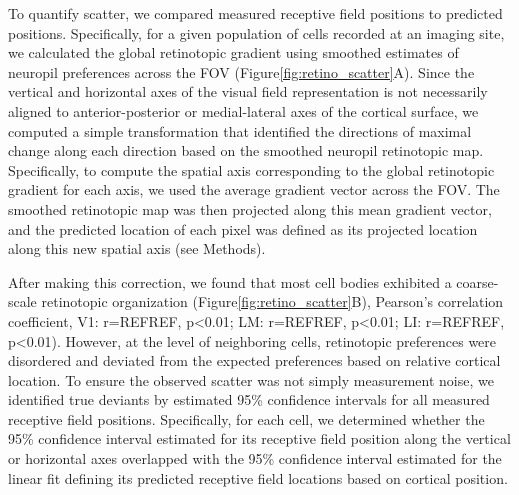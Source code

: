 To quantify scatter, we compared measured receptive field positions to predicted positions. Specifically, for a given population of cells recorded at an imaging site, we calculated the global retinotopic gradient using smoothed estimates of neuropil preferences across the FOV (Figure\ref{fig:retino_scatter}A). Since the vertical and horizontal axes of the visual field representation is not necessarily aligned to anterior-posterior or medial-lateral axes of the cortical surface, we computed a simple transformation that identified the directions of maximal change along each direction based on the smoothed neuropil retinotopic map. Specifically, to compute the spatial axis corresponding to the global retinotopic gradient for each axis, we used the average gradient vector across the FOV. The smoothed retinotopic map was then 
projected along this mean gradient vector, and the predicted location of each pixel was defined as its projected location along this new spatial axis (see Methods).  

After making this correction, we found that most cell bodies exhibited a coarse-scale retinotopic organization (Figure\ref{fig:retino_scatter}B), Pearson's correlation coefficient, V1: r=REFREF, p<0.01; LM: r=REFREF, p<0.01; LI: r=REFREF, p<0.01). However, at the level of neighboring cells, retinotopic preferences were disordered and deviated from the expected preferences based on relative cortical location. To ensure the observed scatter was not simply measurement noise, we identified true deviants by estimated 95\% confidence intervals for all measured receptive field positions. Specifically, for each cell, we determined whether the 95\% confidence interval estimated for its receptive field position along the vertical or horizontal axes overlapped with the 95\% confidence interval estimated for the linear fit defining its predicted receptive field locations based on cortical position.  

